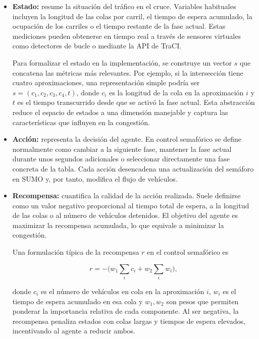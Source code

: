 \begin{itemize}
  \item \textbf{Estado:} resume la situación del tráfico en el cruce.
    Variables habituales incluyen la longitud de las colas por carril,
    el tiempo de espera acumulado, la ocupación de los carriles o el
    tiempo restante de la fase actual. Estas mediciones pueden
    obtenerse en tiempo real a través de sensores virtuales como
    detectores de bucle o mediante la API de TraCI.

    Para formalizar el estado en la implementación, se construye un
    vector $s$ que concatena las métricas más relevantes.  Por
    ejemplo, si la intersección tiene cuatro aproximaciones, una
    representación simple podría ser $s = (c_1,c_2,c_3,c_4,t)$, donde
    $c_i$ es la longitud de la cola en la aproximación $i$ y $t$ es el
    tiempo transcurrido desde que se activó la fase actual.  Esta
    abstracción reduce el espacio de estados a una dimensión manejable
    y captura las características que influyen en la congestión.

  \item \textbf{Acción:} representa la decisión del agente. En
    control semafórico se define normalmente como cambiar a la
    siguiente fase, mantener la fase actual durante unos segundos
    adicionales o seleccionar directamente una fase concreta de la
    tabla.  Cada acción desencadena una actualización del semáforo en
    SUMO y, por tanto, modifica el flujo de vehículos.

  \item \textbf{Recompensa:} cuantifica la calidad de la acción
    realizada. Suele definirse como un valor negativo proporcional al
    tiempo total de espera, a la longitud de las colas o al número de
    vehículos detenidos. El objetivo del agente es maximizar la
    recompensa acumulada, lo que equivale a minimizar la congestión.

    Una formulación típica de la recompensa $r$ en el control
    semafórico es

    \[
      r = -\bigl(w_1 \sum_i c_i + w_2 \sum_i w_i\bigr),
    \]

    donde $c_i$ es el número de vehículos en cola en la aproximación
    $i$, $w_i$ es el tiempo de espera acumulado en esa cola y $w_1,w_2$
    son pesos que permiten ponderar la importancia relativa de cada
    componente.  Al ser negativa, la recompensa penaliza estados con
    colas largas y tiempos de espera elevados, incentivando al agente a
    reducir ambos.
\end{itemize}

